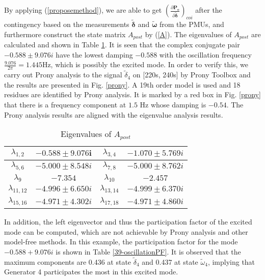 \documentclass[journal]{IEEEtran}
\begin{document}
By applying (\ref{proposemethod}), we are able to get $(\frac{\partial\bm{P_e}}{\partial\bm{\tilde{\delta}}})_{coi}$ after the contingency based on the measurements $\tilde{\bm{\delta}}$ and $\tilde{\bm{\omega}}$ from the PMUs, and furthermore construct the state matrix $A_{post}$ by (\ref{A}). The eigenvalues of $A_{post}$ are calculated and shown in Table \ref{39-oscillationeigenvalue}. It is seen that the complex conjugate pair ${-0.588 \pm 9.076i}$ have the lowest damping $-0.588$ with the oscillation frequency $\frac{9.076}{2\pi}=1.445$Hz, which is possibly the excited mode. In order to verify this, we carry out Prony analysis to the signal $\tilde{\delta}_4$ on [220s, 240s] by Prony Toolbox \cite{Pronytoolbox} and the results are presented in Fig. \ref{prony}. A 19th order model is used and 18 residues are identified by Prony analysis. It is marked by a red box in Fig. \ref{prony} that there is a frequency component at $1.5$ Hz whose damping is $-0.54$. The Prony analysis results are aligned with the eigenvalue analysis results.

\begin{table}[!ht]
\centering
\caption{Eigenvalues of $A_{post}$}\label{39-oscillationeigenvalue}
\begin{tabular}{|c|c|c|c|}
\hline
$\lambda_{1,2}$& $\mathbf{-0.588 \pm 9.076i}$&$\lambda_{3,4}$&$-1.070 \pm 5.769i$\\
\hline
$\lambda_{5,6}$&$-5.000\pm 8.548i$&$\lambda_{7,8}$&$ -5.000 \pm 8.762i$\\
\hline
$\lambda_{9}$& $-7.354$&$\lambda_{10}$&$-2.457$\\
\hline
$\lambda_{11,12}$&$-4.996 \pm 6.650i$&$\lambda_{13,14}$&$-4.999 \pm 6.370i$\\
\hline
$\lambda_{15,16}$&$-4.971 \pm 4.302i$&$\lambda_{17,18}$&$-4.971 \pm 4.860i$\\
\hline
\end{tabular}
\end{table}


In addition, the left eigenvector and thus the participation factor of the excited mode can be computed, which are not achievable by Prony analysis and other model-free methods.  In this example, the participation factor for the mode $-0.588+9.076i$ is shown in Table \ref{39-oscillationPF}. It is observed that the maximum components are 0.436 at state $\tilde{\delta}_4$ and 0.437 at state $\tilde{\omega}_4$, implying that Generator 4 participates the most in this excited mode.
\end{document}
